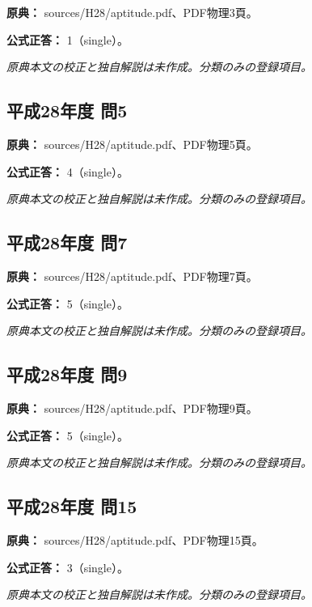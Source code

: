 \noindent\textbf{原典：} sources/H28/aptitude.pdf、PDF物理3頁。

\textbf{公式正答：} 1（single）。

\par\textit{原典本文の校正と独自解説は未作成。分類のみの登録項目。}

\subsection{平成28年度 問5}
\label{q:h28-reg-apt-05}

\noindent\textbf{原典：} sources/H28/aptitude.pdf、PDF物理5頁。

\textbf{公式正答：} 4（single）。

\par\textit{原典本文の校正と独自解説は未作成。分類のみの登録項目。}

\subsection{平成28年度 問7}
\label{q:h28-reg-apt-07}

\noindent\textbf{原典：} sources/H28/aptitude.pdf、PDF物理7頁。

\textbf{公式正答：} 5（single）。

\par\textit{原典本文の校正と独自解説は未作成。分類のみの登録項目。}

\subsection{平成28年度 問9}
\label{q:h28-reg-apt-09}

\noindent\textbf{原典：} sources/H28/aptitude.pdf、PDF物理9頁。

\textbf{公式正答：} 5（single）。

\par\textit{原典本文の校正と独自解説は未作成。分類のみの登録項目。}

\subsection{平成28年度 問15}
\label{q:h28-reg-apt-15}

\noindent\textbf{原典：} sources/H28/aptitude.pdf、PDF物理15頁。

\textbf{公式正答：} 3（single）。

\par\textit{原典本文の校正と独自解説は未作成。分類のみの登録項目。}

